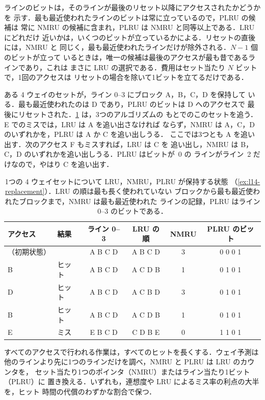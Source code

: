 \documentclass[../main.tex]{subfiles}
\begin{document}
ラインのビットは，そのラインが最後のリセット以降にアクセスされたかどうかを
示す．最も最近使われたラインのビットは常に立っているので，PLRU の候補は
常に NMRU の候補に含まれ，PLRU は NMRU と同等以上である．LRU にどれだけ
近いかは，いくつのビットが立っているかによる．リセットの直後には，NMRU と
同じく，最も最近使われたラインだけが除外される．$N-1$ 個のビットが立って
いるときは，唯一の候補は最後のアクセスが最も昔であるラインであり，これは
まさに LRU の選択である．費用はセット当たり $N$ ビットで，1回のアクセスは
リセットの場合を除いて1ビットを立てるだけである．

\begin{example}
  \label{ex:l14-replacement}
  ある 4 ウェイのセットが，ライン 0--3 にブロック A，B，C，D を保持して
  いる．最も最近使われたのは D であり，PLRU のビットは D へのアクセスで
  最後にリセットされた．\cref{tab:l14-replacement} は，3つのアルゴリズムの
  もとでのこのセットを追う．E でのミスでは，LRU は A を追い出さなければ
  ならず，NMRU は A，C，D のいずれかを，PLRU は A か C を追い出しうる．
  ここでは3つとも A を追い出す．次のアクセス F もミスすれば，LRU は C を
  追い出し，NMRU は B，C，D のいずれかを追い出しうる．PLRU はビットが~0 の
  ラインがライン~2 だけなので，やはり C を追い出す．
\end{example}

\begin{table}[htbp]
  \centering\small
  \caption{1つの 4 ウェイセットについて LRU，NMRU，PLRU が保持する状態
    （\cref{ex:l14-replacement}）．LRU の順は最も長く使われていない
    ブロックから最も最近使われたブロックまで，NMRU は最も最近使われた
    ラインの記録，PLRU はライン 0--3 のビットである．}
  \label{tab:l14-replacement}
  \begin{tabular}{@{}llcccc@{}}
    \toprule
    アクセス & 結果 & ライン 0--3 & LRU の順 & NMRU & PLRU のビット \\
    \midrule
    （初期状態） &      & A B C D & A B C D & 3 & 0 0 0 1 \\
    B         & ヒット & A B C D & A C D B & 1 & 0 1 0 1 \\
    D         & ヒット & A B C D & A C B D & 3 & 0 1 0 1 \\
    B         & ヒット & A B C D & A C D B & 1 & 0 1 0 1 \\
    E         & ミス   & E B C D & C D B E & 0 & 1 1 0 1 \\
    \bottomrule
  \end{tabular}
\end{table}

\begin{keypoint}
  すべてのアクセスで行われる作業は，すべてのヒットを長くする．ウェイ予測は
  他のラインより先に1つのラインだけを調べ，NMRU と PLRU は LRU のカウンタを，
  セット当たり1つのポインタ（NMRU）またはライン当たり1ビット（PLRU）に
  置き換える．いずれも，連想度や LRU によるミス率の利点の大半を，ヒット
  時間の代償のわずかな割合で保つ．
\end{keypoint}
\end{document}
